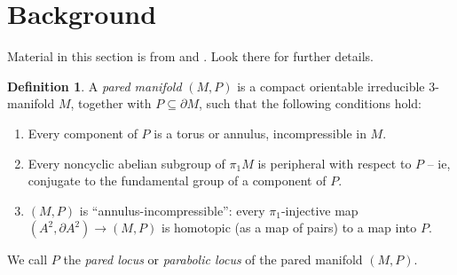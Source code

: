\documentclass[12pt]{amsart}
\theoremstyle{definition}
\newtheorem{defn}[theorem]{Definition}
\theoremstyle{remark}
\newcommand{\bd}{\partial}
\newcommand{\Si}{\Sigma}
\newcommand{\cin}{\subseteq}
\begin{document}
%
%
%
%

\section{Background}

Material in this section is from \cite{Mo} and \cite{CMc}. Look there for
further details.

%
\begin{defn}

A \emph{pared manifold} $(M,P)$ is a compact orientable irreducible 3-manifold
$M$, together with $P\cin\bd M$, such that the following conditions hold:

\begin{enumerate}
\item Every component of $P$ is a torus or annulus, incompressible in $M$.

\item Every noncyclic abelian subgroup of $\pi_1M$ is peripheral with respect
to $P$ -- ie, conjugate to the fundamental group of a component of $P$.

\item $(M,P)$ is ``annulus-incompressible'': every $\pi_1$-injective map $(A^2,
\bd A^2) \to (M,P)$ is homotopic (as a map of pairs) to a map into $P$.

\end{enumerate}

We call $P$ the \emph{pared locus} or \emph{parabolic locus} of the pared
manifold $(M,P)$.

\end{defn}
\end{document}
